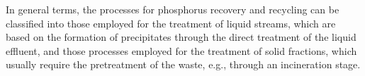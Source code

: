 \documentclass[authoryear]{elsarticle}
\begin{document}
In general terms, the processes for phosphorus recovery and recycling can be classified into those employed for the treatment of liquid streams, which are based on the formation of precipitates through the direct treatment of the liquid effluent, and those processes employed for the treatment of solid fractions, which usually require the pretreatment of the waste, e.g., through an incineration stage.



\end{document}
